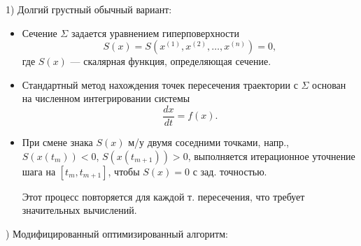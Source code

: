 	1) Долгий грустный обычный вариант:
	\begin{itemize}
		\item Сечение \(\Sigma\) задается уравнением гиперповерхности
		\begin{equation}
			S(x) = S(x^{(1)}, x^{(2)}, \dots, x^{(n)}) = 0,
		\end{equation}
		где \(S(x)\) — скалярная функция, определяющая сечение.
		\item Стандартный метод нахождения точек пересечения траектории с \(\Sigma\) основан на численном интегрировании системы
		\begin{equation}
			\frac{dx}{dt} = f(x).
		\end{equation}
		\item При смене знака \(S(x)\) м/у двумя соседними точками, напр., \(S(x(t_m)) < 0\), \(S(x(t_{m+1})) > 0\), выполняется итерационное уточнение шага на \([t_m, t_{m+1}]\), чтобы \(S(x) = 0\) с зад. точностью. 
		\par
		Этот процесс повторяется для каждой т. пересечения, что требует значительных вычислений.
	\end{itemize}
	) Модифицированный оптимизированный алгоритм:
